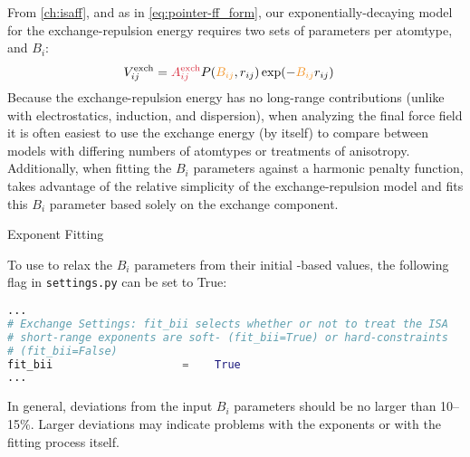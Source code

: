 From \cref{ch:isaff}, and as in \cref{eq:pointer-ff_form},
our exponentially-decaying model for the exchange-repulsion energy 
requires two sets of parameters per atomtype,  and $B_i$: 
%
\newcommand{\bij}{\textcolor{cfit}{B_{ij}}}
\newcommand{\bijr}{\bij r}
\begin{align}
\vrep_{ij} &= \textcolor{fit}{\Aex{ij}} P(\bij, r_{ij}) \exp(-\bijr_{ij})
\end{align}
%
Because the exchange-repulsion energy has no long-range contributions (unlike
with electrostatics, induction, and dispersion), when analyzing the final
force field it is often easiest to use the exchange energy (by itself) to
compare between models with differing numbers of atomtypes or treatments of
anisotropy. Additionally, when fitting the $B_i$ parameters against a harmonic
penalty function, \pointer takes advantage of the relative simplicity of the
exchange-repulsion model and fits this $B_i$ parameter based solely on the
exchange component.

\begin{paragraph}{Exponent Fitting}

To use \pointer to relax the $B_i$ parameters from their initial \isa-based values, the
following flag in \verb|settings.py| can be set to True:

\begin{lstlisting}[language=python]
...
# Exchange Settings: fit_bii selects whether or not to treat the ISA
# short-range exponents are soft- (fit_bii=True) or hard-constraints
# (fit_bii=False)
fit_bii                    =    True
...
\end{lstlisting}
In general, deviations from the input $B_i$ parameters should be no larger
than 10--15\%. Larger deviations may indicate problems with the \bsisa
exponents or with the fitting process itself.

\end{paragraph}
